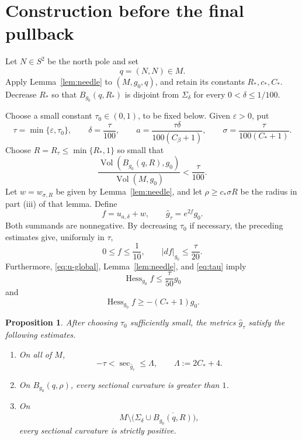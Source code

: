 \documentclass[11pt]{amsart}
\newtheorem{proposition}[theorem]{Proposition}
\theoremstyle{definition}
\newcommand{\Vol}{\operatorname{Vol}}
\newcommand{\Hess}{\operatorname{Hess}}
\begin{document}
\section{Construction before the final pullback}

Let $N\in S^2$ be the north pole and set
\[
 q=(N,N)\in M.
\]
Apply Lemma~\ref{lem:needle} to $(M,g_0,q)$, and retain its constants
$R_*,c_*,C_*$.  Decrease $R_*$ so that $B_{g_0}(q,R_*)$ is disjoint from
$\Sigma_\delta$ for every $0<\delta\le1/100$.

Choose a small constant $\tau_0\in(0,1)$, to be fixed below.  Given
$\varepsilon>0$, put
\begin{equation}\label{eq:tau}
 \tau=\min\{\varepsilon,\tau_0\},
 \qquad
 \delta=\frac{\tau}{100},
 \qquad
 a=\frac{\tau\delta}{100(C_\beta+1)},
 \qquad
 \sigma=\frac{\tau}{100(C_*+1)}.
\end{equation}
Choose $R=R_\tau\le\min\{R_*,1\}$ so small that
\begin{equation}\label{eq:R-volume}
 \frac{\Vol(B_{g_0}(q,R),g_0)}{\Vol(M,g_0)}<\frac{\tau}{100}.
\end{equation}
Let $w=w_{\sigma,R}$ be given by Lemma~\ref{lem:needle}, and let
$\rho\ge c_*\sigma R$ be the radius in part (iii) of that lemma.  Define
\begin{equation}\label{eq:f-total}
 f=u_{a,\delta}+w,
 \qquad
 \widehat g_\tau=e^{2f}g_0.
\end{equation}
Both summands are nonnegative.  By decreasing $\tau_0$ if necessary, the preceding estimates give, uniformly in $\tau$,
\begin{equation}\label{eq:f-small}
 0\le f\le\frac1{10},
 \qquad
 |df|_{g_0}\le\frac{\tau}{20}.
\end{equation}
Furthermore, \eqref{eq:u-global}, Lemma~\ref{lem:needle}, and
\eqref{eq:tau} imply
\begin{equation}\label{eq:hess-total-upper}
 \Hess_{g_0}f
 \le\frac{\tau}{50}g_0
\end{equation}
and
\begin{equation}\label{eq:hess-total-lower}
 \Hess_{g_0}f\ge-(C_*+1)g_0.
\end{equation}

\begin{proposition}\label{prop:curvature-hat}
After choosing $\tau_0$ sufficiently small, the metrics
$\widehat g_\tau$ satisfy the following estimates.
\begin{enumerate}[label=\textup{(\roman*)}]
 \item On all of $M$,
 \[
  -\tau<\sec_{\widehat g_\tau}\le\Lambda,
  \qquad
  \Lambda:=2C_*+4.
 \]
 \item On $B_{g_0}(q,\rho)$, every sectional curvature is greater than $1$.
 \item On
 \[
  M\setminus\bigl(\Sigma_\delta\cup\overline{B_{g_0}(q,R)}\bigr),
 \]
every sectional curvature is strictly positive.
\end{enumerate}
\end{proposition}
\end{document}
